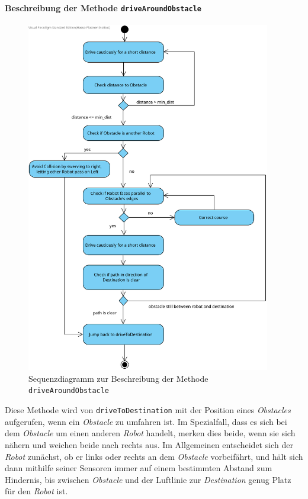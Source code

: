 			\paragraph{Beschreibung der Methode \texttt{driveAroundObstacle}}
			\begin{figure}[H]
			\centering
			\includegraphics[width=0.95\textwidth]{img/1-Entwurf-7-driveAroundObstacle}
			\caption{Sequenzdiagramm zur Beschreibung der Methode \texttt{driveAroundObstacle}}
			\label{SequenzDriveAroundObstacle}
			\end{figure}

			Diese Methode wird von \texttt{driveToDestination} mit der Position eines \textit{Obstacles} aufgerufen, 
			wenn ein \textit{Obstacle} zu umfahren ist. 
			Im Spezialfall, dass es sich bei dem \textit{Obstacle} um einen anderen \textit{Robot} handelt, merken dies beide, wenn sie sich nähern und weichen beide nach rechts aus. Im Allgemeinen entscheidet sich der \emph{Robot} zunächst, ob er links oder rechts an dem \textit{Obstacle} vorbeifährt, 
			und hält sich dann mithilfe seiner Sensoren immer auf einem bestimmten Abstand zum Hindernis, bis zwischen 
			\textit{Obstacle} und der Luftlinie zur \textit{Destination} genug Platz für den \textit{Robot} ist.
			
